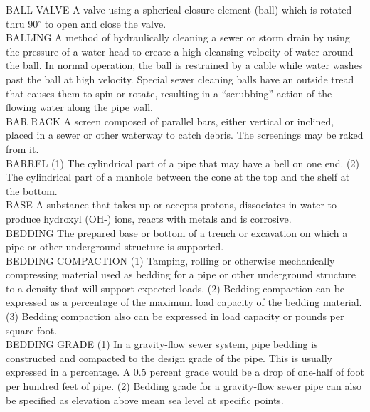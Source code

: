 \documentclass{article}
\begin{document}
BALL VALVE
A valve using a spherical closure element (ball) which is rotated thru 90$^{\circ}$ to open and close the valve.
\vspace{0.3cm}\\
BALLING
A method of hydraulically cleaning a sewer or storm drain by using the pressure of a water head to create a high cleansing velocity of water around the ball. In normal operation, the ball is restrained by a cable while water washes past the ball at high velocity. Special sewer cleaning balls have an outside tread that causes them to spin or rotate, resulting in a “scrubbing” action of the flowing water along the pipe wall. 
\vspace{0.3cm}\\
BAR RACK
A screen composed of parallel bars, either vertical or inclined, placed in a sewer or other waterway to catch debris. The screenings may be raked from it. 
\vspace{0.3cm}\\
BARREL
(1) The cylindrical part of a pipe that may have a bell on one end. (2) The cylindrical part of a manhole between the cone at the top and the shelf at the bottom. 
\vspace{0.3cm}\\
BASE
A substance that takes up or accepts protons, dissociates in water to produce hydroxyl (OH-) ions, reacts with metals and is corrosive.
\vspace{0.3cm}\\
BEDDING
The prepared base or bottom of a trench or excavation on which a pipe or other underground structure is supported. 
\vspace{0.3cm}\\
BEDDING COMPACTION
(1) Tamping, rolling or otherwise mechanically compressing material used as bedding for a pipe or other underground structure to a density that will support expected loads. (2) Bedding compaction can be expressed as a percentage of the maximum load capacity of the bedding material. (3) Bedding compaction also can be expressed in load capacity or pounds per square foot. 
\vspace{0.3cm}\\
BEDDING GRADE
(1) In a gravity-flow sewer system, pipe bedding is constructed and compacted to the design grade of the pipe. This is usually expressed in a percentage. A 0.5 percent grade would be a drop of one-half of foot per hundred feet of pipe. (2) Bedding grade for a gravity-flow sewer pipe can also be specified as elevation above mean sea level at specific points. 
\end{document}
